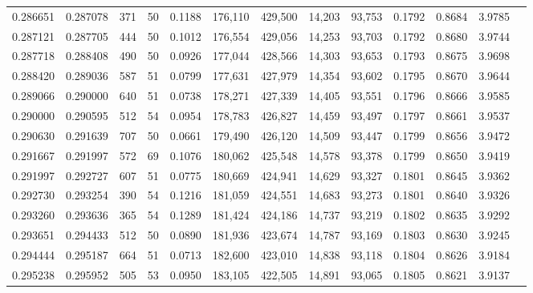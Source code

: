 \begin{tabular}{rrrrrrrrrrrrr}
0.286651 & 0.287078 &    371 &    50 &                                     0.1188 & 176,110 & 429,500 &  14,203 &  93,753 & 0.1792 & 0.8684 & 3.9785 \\
0.287121 & 0.287705 &    444 &    50 &                                     0.1012 & 176,554 & 429,056 &  14,253 &  93,703 & 0.1792 & 0.8680 & 3.9744 \\
0.287718 & 0.288408 &    490 &    50 &                                     0.0926 & 177,044 & 428,566 &  14,303 &  93,653 & 0.1793 & 0.8675 & 3.9698 \\
0.288420 & 0.289036 &    587 &    51 &                                     0.0799 & 177,631 & 427,979 &  14,354 &  93,602 & 0.1795 & 0.8670 & 3.9644 \\
0.289066 & 0.290000 &    640 &    51 &                                     0.0738 & 178,271 & 427,339 &  14,405 &  93,551 & 0.1796 & 0.8666 & 3.9585 \\
0.290000 & 0.290595 &    512 &    54 &                                     0.0954 & 178,783 & 426,827 &  14,459 &  93,497 & 0.1797 & 0.8661 & 3.9537 \\
0.290630 & 0.291639 &    707 &    50 &                                     0.0661 & 179,490 & 426,120 &  14,509 &  93,447 & 0.1799 & 0.8656 & 3.9472 \\
0.291667 & 0.291997 &    572 &    69 &                                     0.1076 & 180,062 & 425,548 &  14,578 &  93,378 & 0.1799 & 0.8650 & 3.9419 \\
0.291997 & 0.292727 &    607 &    51 &                                     0.0775 & 180,669 & 424,941 &  14,629 &  93,327 & 0.1801 & 0.8645 & 3.9362 \\
0.292730 & 0.293254 &    390 &    54 &                                     0.1216 & 181,059 & 424,551 &  14,683 &  93,273 & 0.1801 & 0.8640 & 3.9326 \\
0.293260 & 0.293636 &    365 &    54 &                                     0.1289 & 181,424 & 424,186 &  14,737 &  93,219 & 0.1802 & 0.8635 & 3.9292 \\
0.293651 & 0.294433 &    512 &    50 &                                     0.0890 & 181,936 & 423,674 &  14,787 &  93,169 & 0.1803 & 0.8630 & 3.9245 \\
0.294444 & 0.295187 &    664 &    51 &                                     0.0713 & 182,600 & 423,010 &  14,838 &  93,118 & 0.1804 & 0.8626 & 3.9184 \\
0.295238 & 0.295952 &    505 &    53 &                                     0.0950 & 183,105 & 422,505 &  14,891 &  93,065 & 0.1805 & 0.8621 & 3.9137 \\

\end{tabular}
